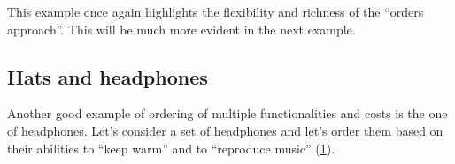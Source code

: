 This example once again highlights the flexibility and richness of the ``orders approach''.
This will be much more evident in the next example.



\subsection{Hats and headphones}
Another good example of ordering of multiple functionalities and costs is the one of headphones.
Let's consider a set of headphones and let's order them based on their abilities to ``keep warm'' and to ``reproduce music'' (\cref{fig:headpho_fun}).

\begin{figure}[h!]
  \begin{center}
\end{center}
  \caption{\label{fig:headpho_fun}}
\end{figure}

\devel{} %
